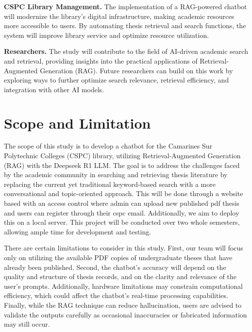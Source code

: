 \begin{refsection}
\bigbreak
\noindent \textbf{CSPC Library Management.} The implementation of a RAG-powered chatbot will modernize the library’s digital infrastructure, making academic resources more accessible to users. By automating thesis retrieval and search functions, the system will improve library service and optimize resource utilization.

\bigbreak
\noindent \textbf{Researchers.} The study will contribute to the field of AI-driven academic search and retrieval, providing insights into the practical applications of Retrieval-Augmented Generation (RAG). Future researchers can build on this work by exploring ways to further optimize search relevance, retrieval efficiency, and integration with other AI models.

\section{Scope and Limitation}

\hspace{1cm}The scope of this study is to develop a chatbot for the Camarines Sur Polytechnic Colleges (CSPC) library, utilizing Retrieval-Augmented Generation (RAG) with the Deepseek R1 LLM. The goal is to address the challenges faced by the academic community in searching and retrieving thesis literature by replacing the current yet traditional keyword-based search with a more conversational and topic-oriented approach. This will be done through a website based with an access control where admin can upload new published pdf thesis and users can register through their cspc email. Additionally, we aim to deploy this on a local server. This project will be conducted over two whole semesters, allowing ample time for development and testing.

\bigbreak
\hspace{0.4cm}There are certain limitations to consider in this study. First, our team will focus only on utilizing the available PDF copies of undergraduate theses that have already been published. Second, the chatbot’s accuracy will depend on the quality and structure of thesis records, and on the clarity and relevance of the user's prompts. Additionally, hardware limitations may constrain computational efficiency, which could affect the chatbot’s real-time processing capabilities. Finally, while the RAG technique can reduce hallucination, users are advised to validate the outputs carefully as occasional inaccuracies or fabricated information may still occur. 



\end{refsection}
